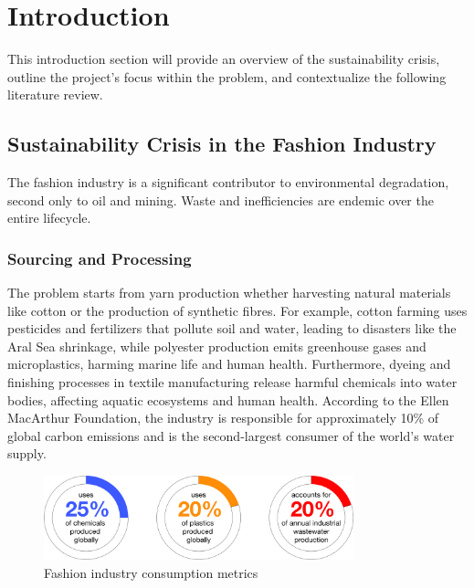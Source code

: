 \chapter{Introduction}

This introduction section will provide an overview of the sustainability crisis, outline the project's focus within the problem, and contextualize the following literature review.

\section{Sustainability Crisis in the Fashion Industry}
The fashion industry is a significant contributor to environmental degradation, second only to oil and mining. Waste and inefficiencies are endemic over the entire lifecycle. 
\subsection{Sourcing and Processing}
The problem starts from yarn production whether harvesting natural materials like cotton or the production of synthetic fibres. For example, cotton farming uses pesticides and fertilizers that pollute soil and water, leading to disasters like the Aral Sea shrinkage, while polyester production emits greenhouse gases and microplastics, harming marine life and human health. Furthermore, dyeing and finishing processes in textile manufacturing release harmful chemicals into water bodies, affecting aquatic ecosystems and human health. According to the Ellen MacArthur Foundation, the industry is responsible for approximately 10\% of global carbon emissions and is the second-largest consumer of the world's water supply.
\begin{figure} [H]
    \centering
    \includegraphics[width=0.8\textwidth]{Images/sourcing donuts.png}
    \caption{Fashion industry consumption metrics}
\end{figure}
